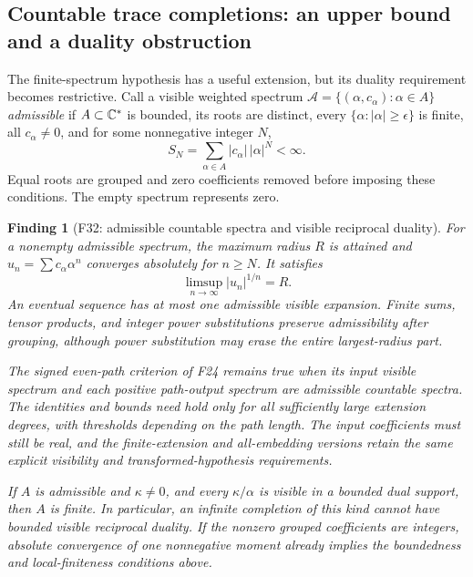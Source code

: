 \documentclass[11pt,a4paper]{article}
\newcommand{\fid}[1]{\textsf{#1}}\newcommand{\gate}[1]{\textsf{#1}}
\theoremstyle{named}\newtheorem{finding}{Finding}[section]
\theoremstyle{definition}\newtheorem{definition}[finding]{Definition}
\theoremstyle{remark}\newtheorem{remark}[finding]{Remark}
\begin{document}
\subsection{Countable trace completions: an upper bound and a duality obstruction}
The finite-spectrum hypothesis has a useful extension, but its duality
requirement becomes restrictive. Call a visible weighted spectrum
$\mathcal A=\{(\alpha,c_\alpha):\alpha\in A\}$ \emph{admissible} if
$A\subset\mathbb C^*$ is bounded, its roots are distinct, every
$\{\alpha:|\alpha|\ge\epsilon\}$ is finite, all $c_\alpha\ne0$, and
for some nonnegative integer $N$,
\[
 S_N=\sum_{\alpha\in A}|c_\alpha|\,|\alpha|^N<\infty.
\]
Equal roots are grouped and zero coefficients removed before imposing
these conditions. The empty spectrum represents zero.

\begin{finding}[\fid{F32}: admissible countable spectra and visible reciprocal duality]\label{f:countable}
For a nonempty admissible spectrum, the maximum radius $R$ is attained
and $u_n=\sum c_\alpha\alpha^n$ converges absolutely for $n\ge N$.
It satisfies
\[
 \limsup_{n\to\infty}|u_n|^{1/n}=R.
\]
An eventual sequence has at most one admissible visible expansion.
Finite sums, tensor products, and integer power substitutions preserve
admissibility after grouping, although power substitution may erase the
entire largest-radius part.

The signed even-path criterion of \fid{F24} remains true when its
input visible spectrum and each positive path-output spectrum are
admissible countable spectra. The identities and bounds need hold only
for all sufficiently large extension degrees, with thresholds depending
on the path length. The input coefficients must still be real, and the
finite-extension and all-embedding versions retain the same explicit
visibility and transformed-hypothesis requirements.

If $A$ is admissible and $\kappa\ne0$, and every $\kappa/\alpha$ is
visible in a bounded dual support, then $A$ is finite. In particular,
an infinite completion of this kind cannot have bounded visible
reciprocal duality. If the nonzero grouped coefficients are integers,
absolute convergence of one nonnegative moment already implies the
boundedness and local-finiteness conditions above.
\end{finding}
\end{document}
